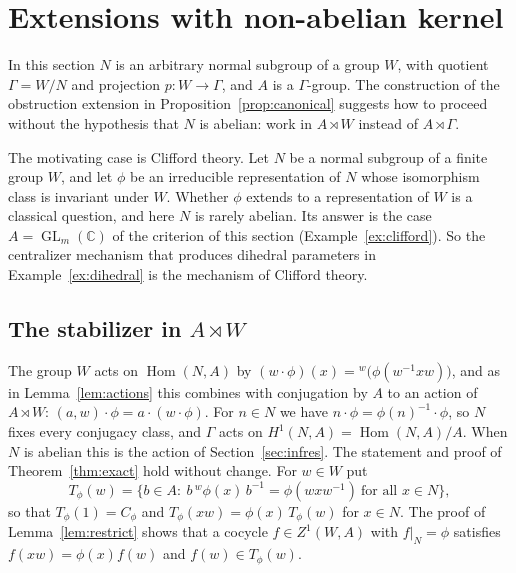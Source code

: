\documentclass[12pt,letterpaper]{article}
\numberwithin{equation}{section}
\theoremstyle{plain}
\theoremstyle{definition}
\newcommand{\C}{\mathbb{C}}
\newcommand{\act}[2]{{}^{#1}\!#2}          %
\DeclareMathOperator{\Hom}{Hom}
\DeclareMathOperator{\GL}{GL}
\begin{document}
\section{Extensions with non-abelian kernel}\label{sec:nonabelian}

In this section $N$ is an arbitrary normal subgroup of a group $W$, with
quotient $\Gamma=W/N$ and projection $p:W\to\Gamma$, and $A$ is a
$\Gamma$-group. The construction of the obstruction extension in
Proposition~\ref{prop:canonical} suggests how to proceed without the
hypothesis that $N$ is abelian: work in $A\rtimes W$ instead of
$A\rtimes\Gamma$.

The motivating case is Clifford theory. Let $N$ be a normal subgroup of
a finite group $W$, and let $\phi$ be an irreducible representation of
$N$ whose isomorphism class is invariant under $W$. Whether $\phi$
extends to a representation of $W$ is a classical question, and here $N$
is rarely abelian. Its answer is the case $A=\GL_m(\C)$ of the criterion
of this section (Example~\ref{ex:clifford}). So the centralizer
mechanism that produces dihedral parameters in
Example~\ref{ex:dihedral} is the mechanism of Clifford theory.

\subsection{The stabilizer in \texorpdfstring{$A\rtimes W$}{A x| W}}

The group $W$ acts on $\Hom(N,A)$ by
$(w\cdot\phi)(x)=\act{w}{\bigl(\phi(w^{-1}xw)\bigr)}$, and as in
Lemma~\ref{lem:actions} this combines with conjugation by $A$ to an action
of $A\rtimes W$: $(a,w)\cdot\phi=a\cdot(w\cdot\phi)$. For $n\in N$ we have
$n\cdot\phi=\phi(n)^{-1}\cdot\phi$, so $N$ fixes every conjugacy class, and
$\Gamma$ acts on $H^1(N,A)=\Hom(N,A)/A$. When $N$ is abelian this is the
action of Section~\ref{sec:infres}. The statement and proof of
Theorem~\ref{thm:exact} hold without change. For $w\in W$ put
\[
T_\phi(w)=\{b\in A:\ b\,\act{w}{\phi(x)}\,b^{-1}=\phi(wxw^{-1})
\ \text{for all } x\in N\},
\]
so that $T_\phi(1)=C_\phi$ and $T_\phi(xw)=\phi(x)\,T_\phi(w)$ for
$x\in N$. The proof of Lemma~\ref{lem:restrict} shows that a cocycle
$f\in Z^1(W,A)$ with $f|_N=\phi$ satisfies $f(xw)=\phi(x)f(w)$ and
$f(w)\in T_\phi(w)$.
\end{document}
